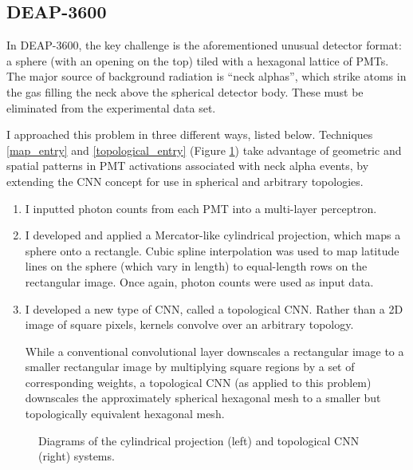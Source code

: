 \documentclass[12pt]{article}
\begin{document}
\subsection{DEAP-3600}

In DEAP-3600, the key challenge is the aforementioned unusual detector format: a sphere (with an opening on the top) tiled with a hexagonal lattice of PMTs. The major source of background radiation is ``neck alphas'', which strike atoms in the gas filling the neck above the spherical detector body. These must be eliminated from the experimental data set.

I approached this problem in three different ways, listed below. Techniques \ref{map_entry} and \ref{topological_entry} (Figure \ref{deap_methods}) take advantage of geometric and spatial patterns in PMT activations associated with neck alpha events, by extending the CNN concept for use in spherical and arbitrary topologies.

\begin{enumerate}
    \item I inputted photon counts from each PMT into a multi-layer perceptron.

    \item I developed and applied a Mercator-like cylindrical projection, which maps a sphere onto a rectangle. Cubic spline interpolation was used to map latitude lines on the sphere (which vary in length) to equal-length rows on the rectangular image. Once again, photon counts were used as input data. \label{map_entry}

    \item I developed a new type of CNN, called a topological CNN. Rather than a 2D image of square pixels, kernels convolve over an arbitrary topology. \label{topological_entry}
    
    While a conventional convolutional layer downscales a rectangular image to a smaller rectangular image by multiplying square regions by a set of corresponding weights, a topological CNN (as applied to this problem) downscales the approximately spherical hexagonal mesh to a smaller but topologically equivalent hexagonal mesh.
\end{enumerate}

\begin{figure}[ht]
    \centering
    \qquad
    \caption{\label{deap_methods} Diagrams of the cylindrical projection (left) and topological CNN (right) systems.}
\end{figure}
\end{document}
